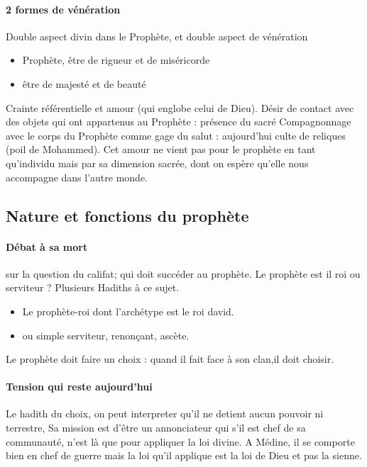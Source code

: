 \paragraph{2 formes de vénération} 
Double aspect divin dans le Prophète, et double aspect de vénération
\begin{itemize}
    \item Prophète, être de rigueur et de miséricorde
    \item être de majesté et de beauté
\end{itemize}

Crainte référentielle et amour (qui englobe celui de Dieu). Désir de contact avec des objets qui ont appartenus au Prophète : présence du sacré
Compagnonnage avec le corps du Prophète comme gage du salut : aujourd'hui culte de reliques (poil de Mohammed).
Cet amour ne vient pas pour le prophète en tant qu'individu mais par sa dimension sacrée, dont on espère qu'elle nous accompagne dans l'autre monde.

\subsection{Nature et fonctions du prophète}

\paragraph{Débat à sa mort} sur la question du califat; qui doit succéder au prophète. Le prophète est il roi ou serviteur ? Plusieurs Hadiths à ce sujet. 
\begin{itemize}
    \item Le prophète-roi dont l'archétype est le roi david. 
\item ou simple serviteur, renonçant, ascète.



\end{itemize}
Le prophète doit faire un choix : quand il fait face à son clan,il doit choisir. 

\paragraph{Tension qui reste aujourd'hui} Le hadith du choix, on peut interpreter qu'il ne detient aucun pouvoir ni terrestre, Sa mission est d'être un annonciateur qui s'il est chef de sa communauté, n'est là que pour appliquer la loi divine.  A Médine, il se comporte bien en chef de guerre mais la loi qu'il applique est la loi de Dieu et pas la sienne.


